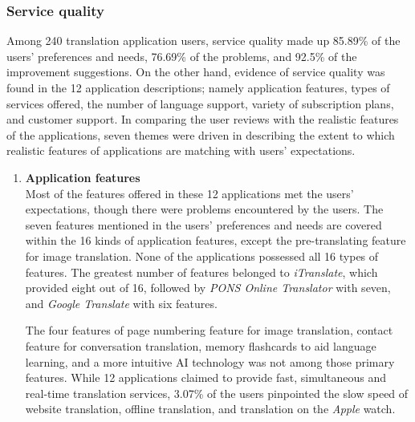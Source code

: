 \documentclass[english]{textolivre}
\begin{document}
\subsubsection{Service quality}
Among 240 translation application users, service quality made up 85.89\% of the users’ preferences and needs, 76.69\% of the problems, and 92.5\% of the improvement suggestions. On the other hand, evidence of service quality was found in the 12 application descriptions; namely application features, types of services offered, the number of language support, variety of subscription plans, and customer support. In comparing the user reviews with the realistic features of the applications, seven themes were driven in describing the extent to which realistic features of applications are matching with users’ expectations.

\begin{enumerate}
    \item \textbf{Application features} \\
    Most of the features offered in these 12 applications met the users’ expectations, though there were problems encountered by the users. The seven features mentioned in the users’ preferences and needs are covered within the 16 kinds of application features, except the pre-translating feature for image translation. None of the applications possessed all 16 types of features. The greatest number of features belonged to \textit{iTranslate}, which provided eight out of 16, followed by \textit{PONS Online Translator} with seven, and \textit{Google Translate} with six features.
    
	The four features of page numbering feature for image translation, contact feature for conversation translation, memory flashcards to aid language learning, and a more intuitive AI technology was not among those primary features. While 12 applications claimed to provide fast, simultaneous and real-time translation services, 3.07\% of the users pinpointed the slow speed of website translation, offline translation, and translation on the \textit{Apple} watch.
 

\end{enumerate}
\end{document}
